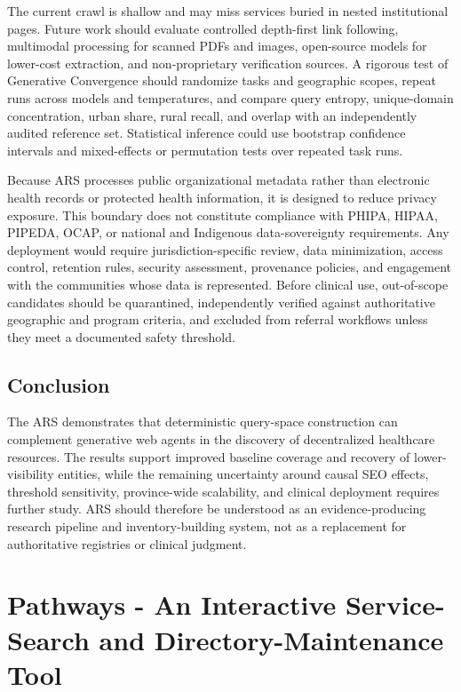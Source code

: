 \documentclass[12pt,oneside]{report}
\begin{document}
The current crawl is shallow and may miss services buried in nested institutional pages. Future work should evaluate controlled depth-first link following, multimodal processing for scanned PDFs and images, open-source models for lower-cost extraction, and non-proprietary verification sources. A rigorous test of Generative Convergence should randomize tasks and geographic scopes, repeat runs across models and temperatures, and compare query entropy, unique-domain concentration, urban share, rural recall, and overlap with an independently audited reference set. Statistical inference could use bootstrap confidence intervals and mixed-effects or permutation tests over repeated task runs.

Because ARS processes public organizational metadata rather than electronic health records or protected health information, it is designed to reduce privacy exposure. This boundary does not constitute compliance with PHIPA, HIPAA, PIPEDA, OCAP, or national and Indigenous data-sovereignty requirements. Any deployment would require jurisdiction-specific review, data minimization, access control, retention rules, security assessment, provenance policies, and engagement with the communities whose data is represented. Before clinical use, out-of-scope candidates should be quarantined, independently verified against authoritative geographic and program criteria, and excluded from referral workflows unless they meet a documented safety threshold.

\section{Conclusion}
The ARS demonstrates that deterministic query-space construction can complement generative web agents in the discovery of decentralized healthcare resources. The results support improved baseline coverage and recovery of lower-visibility entities, while the remaining uncertainty around causal SEO effects, threshold sensitivity, province-wide scalability, and clinical deployment requires further study. ARS should therefore be understood as an evidence-producing research pipeline and inventory-building system, not as a replacement for authoritative registries or clinical judgment.

\fi

\chapter{Pathways - An Interactive Service-Search and Directory-Maintenance Tool}
\end{document}
